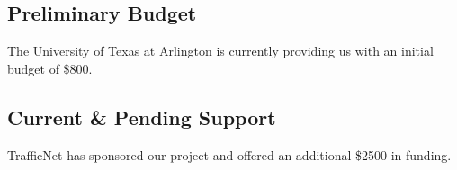 \subsection{Preliminary Budget}
The University of Texas at Arlington is currently providing us with an initial budget of \$800.

\subsection{Current \& Pending Support}
TrafficNet has sponsored our project and offered an additional \$2500 in funding.

